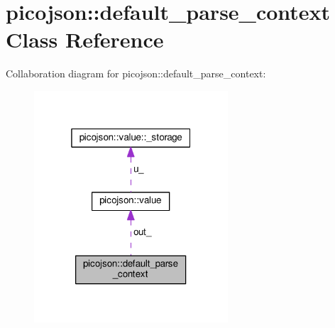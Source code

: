 \hypertarget{classpicojson_1_1default__parse__context}{\section{picojson\+:\+:default\+\_\+parse\+\_\+context Class Reference}
\label{classpicojson_1_1default__parse__context}
}


Collaboration diagram for picojson\+:\+:default\+\_\+parse\+\_\+context\+:\nopagebreak
\begin{figure}[H]
\begin{center}
\leavevmode
\includegraphics[width=205pt]{classpicojson_1_1default__parse__context__coll__graph}
\end{center}
\end{figure}
